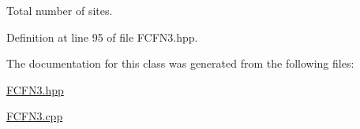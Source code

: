 \-Total number of sites. 



\-Definition at line 95 of file \-F\-C\-F\-N3.\-hpp.



\-The documentation for this class was generated from the following files\-:\begin{DoxyCompactItemize}
\item 
\hyperlink{FCFN3_8hpp}{\-F\-C\-F\-N3.\-hpp}\item 
\hyperlink{FCFN3_8cpp}{\-F\-C\-F\-N3.\-cpp}\end{DoxyCompactItemize}
